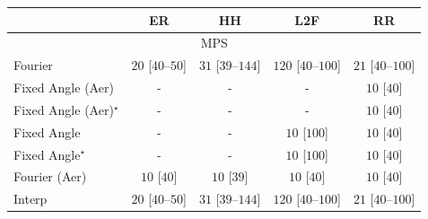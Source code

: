 \begin{tabular}{l|cccc|}
\toprule
            & ER & HH & L2F & RR \\
\midrule
\multicolumn{5}{c}{\rule{0pt}{8pt}MPS} \\
\midrule
Fourier & {\cellcolor[HTML]{F5FBF3}} \color[HTML]{000000} $20$ [$40$--$50$] & {\cellcolor[HTML]{F2FAF0}} \color[HTML]{000000} $31$ [$39$--$144$] & {\cellcolor[HTML]{DCF2D7}} \color[HTML]{000000} $120$ [$40$--$100$] & {\cellcolor[HTML]{F5FBF2}} \color[HTML]{000000} $21$ [$40$--$100$] \\
Fixed Angle (Aer) & {\cellcolor[HTML]{000000}} \color[HTML]{F1F1F1} {\cellcolor{white}} \color{black} - & {\cellcolor[HTML]{000000}} \color[HTML]{F1F1F1} {\cellcolor{white}} \color{black} - & {\cellcolor[HTML]{000000}} \color[HTML]{F1F1F1} {\cellcolor{white}} \color{black} - & {\cellcolor[HTML]{F7FCF5}} \color[HTML]{000000} $10$ [$40$] \\
Fixed Angle (Aer)$^\star$ & {\cellcolor[HTML]{000000}} \color[HTML]{F1F1F1} {\cellcolor{white}} \color{black} - & {\cellcolor[HTML]{000000}} \color[HTML]{F1F1F1} {\cellcolor{white}} \color{black} - & {\cellcolor[HTML]{000000}} \color[HTML]{F1F1F1} {\cellcolor{white}} \color{black} - & {\cellcolor[HTML]{F7FCF5}} \color[HTML]{000000} $10$ [$40$] \\
Fixed Angle & {\cellcolor[HTML]{000000}} \color[HTML]{F1F1F1} {\cellcolor{white}} \color{black} - & {\cellcolor[HTML]{000000}} \color[HTML]{F1F1F1} {\cellcolor{white}} \color{black} - & {\cellcolor[HTML]{F7FCF5}} \color[HTML]{000000} $10$ [$100$] & {\cellcolor[HTML]{F7FCF5}} \color[HTML]{000000} $10$ [$40$] \\
Fixed Angle$^\star$ & {\cellcolor[HTML]{000000}} \color[HTML]{F1F1F1} {\cellcolor{white}} \color{black} - & {\cellcolor[HTML]{000000}} \color[HTML]{F1F1F1} {\cellcolor{white}} \color{black} - & {\cellcolor[HTML]{F7FCF5}} \color[HTML]{000000} $10$ [$100$] & {\cellcolor[HTML]{F7FCF5}} \color[HTML]{000000} $10$ [$40$] \\
Fourier (Aer) & {\cellcolor[HTML]{F7FCF5}} \color[HTML]{000000} $10$ [$40$] & {\cellcolor[HTML]{F7FCF5}} \color[HTML]{000000} $10$ [$39$] & {\cellcolor[HTML]{F7FCF5}} \color[HTML]{000000} $10$ [$40$] & {\cellcolor[HTML]{F7FCF5}} \color[HTML]{000000} $10$ [$40$] \\
Interp & {\cellcolor[HTML]{F5FBF3}} \color[HTML]{000000} $20$ [$40$--$50$] & {\cellcolor[HTML]{F2FAF0}} \color[HTML]{000000} $31$ [$39$--$144$] & {\cellcolor[HTML]{DCF2D7}} \color[HTML]{000000} $120$ [$40$--$100$] & {\cellcolor[HTML]{F5FBF2}} \color[HTML]{000000} $21$ [$40$--$100$] \\

\end{tabular}
